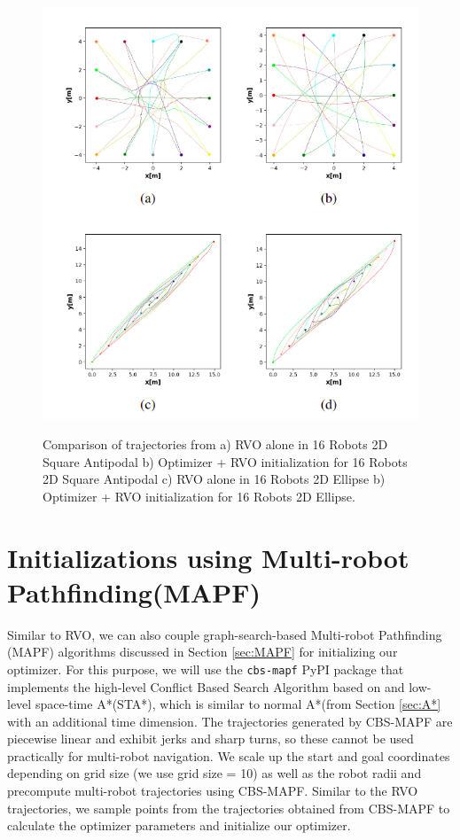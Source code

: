 \begin{figure}[H]
    \centering
    {\includegraphics[scale=0.6]{figures/appendix/RVO_inits.png}} 
    \caption[Appendix: Trajectories using RVO + multi-robot optimizer]{Comparison of trajectories from a) RVO alone in 16 Robots 2D Square Antipodal b) Optimizer + RVO initialization for 16 Robots 2D Square Antipodal c) RVO alone in 16 Robots 2D Ellipse b) Optimizer + RVO initialization for 16 Robots 2D Ellipse.}
    \label{fig:RVO+opti_2D}
\end{figure}

\section{Initializations using Multi-robot Pathfinding(MAPF)\cite{sharon_journal}}\label{sec:appendix-MAPF}

Similar to RVO, we can also couple graph-search-based Multi-robot Pathfinding (MAPF) algorithms discussed in Section \ref{sec:MAPF} for initializing our optimizer. For this purpose, we will use the \texttt{cbs-mapf} PyPI package that implements the high-level Conflict Based Search Algorithm based on \cite{sharon_journal} and low-level space-time A*(STA*), which is similar to normal A*(from Section \ref{sec:A*} with an additional time dimension. The trajectories generated by CBS-MAPF are piecewise linear and exhibit jerks and sharp turns, so these cannot be used practically for multi-robot navigation. We scale up the start and goal coordinates depending on grid size (we use grid size = 10) as well as the robot radii and precompute multi-robot trajectories using CBS-MAPF. Similar to the RVO trajectories, we sample points from the trajectories obtained from CBS-MAPF to calculate the optimizer parameters and initialize our optimizer. 

